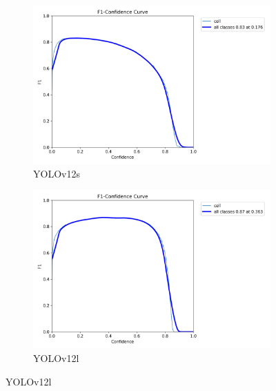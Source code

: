 \documentclass[12pt,a4paper,onecolumn,oneside]{report}
\begin{document}
\begin{figure}[H]
  \vspace{0.5cm}
  \begin{subfigure}[b]{0.48\textwidth}
    \centering
    \includegraphics[width=\textwidth]{figuras/resultados experimentacion/yolov12s/test3/BoxF1_curve.png}
    \caption{YOLOv12s}
    \label{fig:yolov12s_test3}
  \end{subfigure}
  \hfill
  \begin{subfigure}[b]{0.48\textwidth}
    \centering
    \includegraphics[width=\textwidth]{figuras/resultados experimentacion/yolov12l/test3/BoxF1_curve.png}
    \caption{YOLOv12l}
    \label{fig:yolov12l_test3}
  \end{subfigure}
  

\end{figure}
\end{document}
